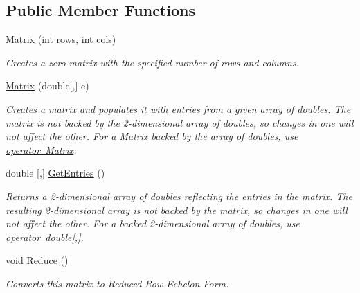 \subsection*{Public Member Functions}
\begin{DoxyCompactItemize}
\item 
\mbox{\hyperlink{class_matrix_demo_1_1_r_t_w_1_1_matrix_a8c22efc901ad89be3078a180a7ac15d0}{Matrix}} (int rows, int cols)
\begin{DoxyCompactList}\small\item\em Creates a zero matrix with the specified number of rows and columns. \end{DoxyCompactList}\item 
\mbox{\hyperlink{class_matrix_demo_1_1_r_t_w_1_1_matrix_ad2a320fd0c86551f34070679fd43433c}{Matrix}} (double\mbox{[},\mbox{]} e)
\begin{DoxyCompactList}\small\item\em Creates a matrix and populates it with entries from a given array of doubles. The matrix is not backed by the 2-\/dimensional array of doubles, so changes in one will not affect the other. For a \mbox{\hyperlink{class_matrix_demo_1_1_r_t_w_1_1_matrix}{Matrix}} backed by the array of doubles, use \mbox{\hyperlink{class_matrix_demo_1_1_r_t_w_1_1_matrix_a0c737f7e6b54edac4d26b4f1c595ee92}{operator Matrix}}. \end{DoxyCompactList}\item 
double \mbox{[},\mbox{]} \mbox{\hyperlink{class_matrix_demo_1_1_r_t_w_1_1_matrix_a9f6f8e0e7acfbdd55852f258daf68b8f}{Get\+Entries}} ()
\begin{DoxyCompactList}\small\item\em Returns a 2-\/dimensional array of doubles reflecting the entries in the matrix. The resulting 2-\/dimensional array is not backed by the matrix, so changes in one will not affect the other. For a backed 2-\/dimensional array of doubles, use \mbox{\hyperlink{class_matrix_demo_1_1_r_t_w_1_1_matrix_ac23641ac04b3c3baf14174bdf9049db2}{operator double\mbox{[},\mbox{]}}}. \end{DoxyCompactList}\item 
void \mbox{\hyperlink{class_matrix_demo_1_1_r_t_w_1_1_matrix_a14fc1e8ce8136690364961901e7becf6}{Reduce}} ()
\begin{DoxyCompactList}\small\item\em Converts this matrix to Reduced Row Echelon Form. \end{DoxyCompactList}\item 

\end{DoxyCompactItemize}
